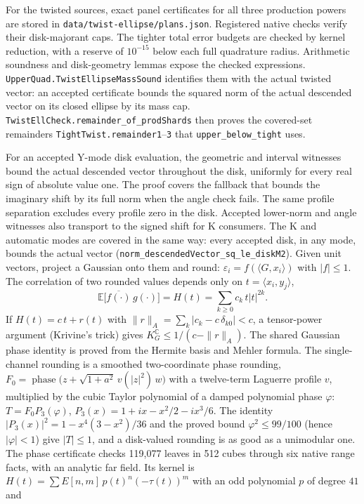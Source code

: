 \documentclass[11pt,a4paper]{article}
\newcommand{\C}{\mathbb{C}}
\newcommand{\E}{\mathbb{E}}
\newcommand{\KG}{K_G^{\C}}
\newcommand{\ph}{\operatorname{phase}}
\newcommand{\lean}[1]{\texttt{\small #1}}
\begin{document}
For the twisted sources, exact panel certificates for all three production powers
are stored in \texttt{data/twist-ellipse/plans.json}. Registered native checks
verify their disk-majorant caps. The tighter total error budgets are checked
by kernel reduction, with a reserve of $10^{-15}$ below each full quadrature radius. Arithmetic soundness and disk-geometry
lemmas expose the checked expressions. \lean{UpperQuad.TwistEllipseMassSound}
identifies them with the actual twisted vector: an accepted certificate bounds
the squared norm of the actual descended vector on its closed ellipse by its
mass cap. \lean{TwistEllCheck.remainder\_of\_prodShards} then proves the
covered-set remainders \lean{TightTwist.remainder1}--\lean{3} that
\lean{upper\_below\_tight} uses.

For an accepted Y-mode disk evaluation, the geometric and interval witnesses
bound the actual descended vector throughout the disk, uniformly for
every real sign of absolute value one. The proof covers the fallback that
bounds the imaginary shift by its full norm when the angle check fails.
The same profile separation excludes every profile zero in the disk.
Accepted lower-norm and angle witnesses also transport to the signed shift
for K consumers. The K and automatic modes are covered in the same way:
every accepted disk, in any mode, bounds the actual vector
(\lean{norm\_descendedVector\_sq\_le\_diskM2}).
Given unit vectors, project a Gaussian onto them and round: $\varepsilon_i=f(\langle G,x_i\rangle)$ with $|f|\le1$. The
correlation of two rounded values depends only on $t=\langle x_i,y_j\rangle$,
\[
 \E\bigl[\overline{f(\cdot)}\,g(\cdot)\bigr]=H(t)=\sum_{k\ge0}c_k\,t|t|^{2k}.
\]
If $H(t)=c\,t+r(t)$ with $\|r\|_A=\sum_k|c_k-c\,\delta_{k0}|<c$, a tensor-power argument (Krivine's trick) gives
$\KG\le1/(c-\|r\|_A)$. The shared Gaussian phase identity is proved from the Hermite basis and Mehler formula. The single-channel rounding is a smoothed two-coordinate phase rounding,
$F_0=\ph\bigl(z+\sqrt{1+a^2}\,v(|z|^2)\,w\bigr)$ with a twelve-term Laguerre profile $v$, multiplied by the cubic Taylor
polynomial of a damped polynomial phase $\varphi$: $T=F_0P_3(\varphi)$, $P_3(x)=1+ix-x^2/2-ix^3/6$. The identity
$|P_3(x)|^2=1-x^4(3-x^2)/36$ and the proved bound $\varphi^2\le99/100$ (hence $|\varphi|<1$) give $|T|\le1$, and a disk-valued rounding is as good as a unimodular one.
The phase certificate checks 119,077 leaves in 512 cubes through six native range facts, with an analytic far field.
Its kernel is $H(t)=\sum E[n,m]\,p(t)^n(-\tau(t))^m$ with an odd polynomial $p$ of degree $41$ and
\end{document}
